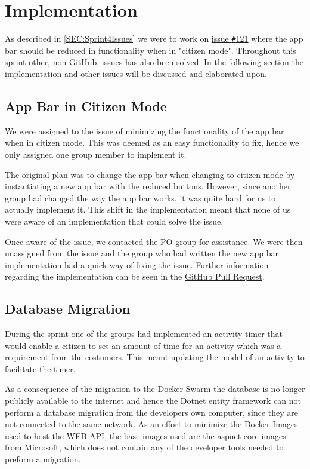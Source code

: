 \section{Implementation}
As described in \autoref{SEC:Sprint4Issues} we were to work on \href{https://github.com/aau-giraf/weekplanner/issues/121}{issue \texttt{\#}121} where the app bar should be reduced in functionality when in "citizen mode". 
Throughout this sprint other, non GitHub, issues has also been solved.
In the following section the implementation and other issues will be discussed and elaborated upon.

\subsection{App Bar in Citizen Mode}
We were assigned to the issue of minimizing the functionality of the app bar when in citizen mode. 
This was deemed as an easy functionality to fix, hence we only assigned one group member to implement it. 

The original plan was to change the app bar when changing to citizen mode by instantiating a new app bar with the reduced buttons. 
However, since another group had changed the way the app bar works, it was quite hard for us to actually implement it.
This shift in the implementation meant that none of us were aware of an implementation that could solve the issue. 

Once aware of the issue, we contacted the PO group for assistance. 
We were then unassigned from the issue and the group who had written the new app bar implementation had a quick way of fixing the issue. 
Further information regarding the implementation can be seen in the \href{https://github.com/aau-giraf/weekplanner/pull/262}{GitHub Pull Request}.

\subsection{Database Migration}
During the sprint one of the groups had implemented an activity timer that would enable a citizen to set an amount of time for an activity which was a requirement from the costumers.
This meant updating the model of an activity to facilitate the timer. 

As a consequence of the migration to the Docker Swarm the database is no longer publicly available to the internet and hence the Dotnet entity framework can not perform a database migration from the developers own computer, since they are not connected to the same network. 
As an effort to minimize the Docker Images used to host the WEB-API, the base images used are the aspnet core images from Microsoft, which does not contain any of the developer tools needed to preform a migration. 

